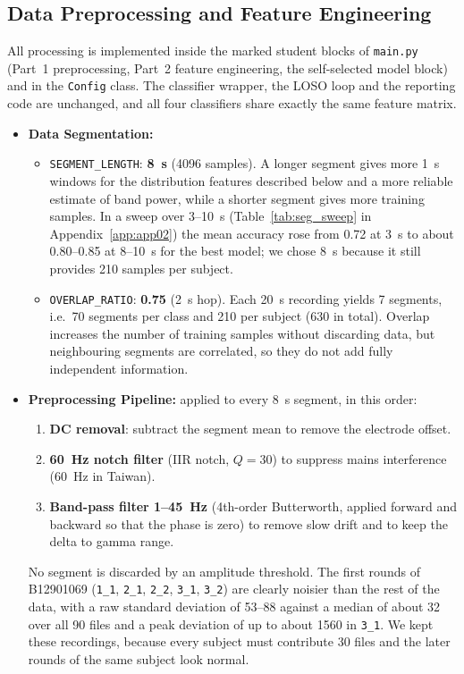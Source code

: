 \subsection{Data Preprocessing and Feature Engineering}
All processing is implemented inside the marked student blocks of \texttt{main.py} (Part~1 preprocessing, Part~2 feature engineering, the self-selected model block) and in the \texttt{Config} class. The classifier wrapper, the LOSO loop and the reporting code are unchanged, and all four classifiers share exactly the same feature matrix.
\begin{itemize}[leftmargin=*]
    \item \textbf{Data Segmentation:}
    \begin{itemize}
        \item \texttt{SEGMENT\_LENGTH}: \textbf{8~s} (4096 samples). A longer segment gives more 1~s windows for the distribution features described below and a more reliable estimate of band power, while a shorter segment gives more training samples. In a sweep over 3--10~s (Table~\ref{tab:seg_sweep} in Appendix~\ref{app:app02}) the mean accuracy rose from 0.72 at 3~s to about 0.80--0.85 at 8--10~s for the best model; we chose 8~s because it still provides 210 samples per subject. 
        \item \texttt{OVERLAP\_RATIO}: \textbf{0.75} (2~s hop). Each 20~s recording yields 7 segments, i.e.\ 70 segments per class and 210 per subject (630 in total). Overlap increases the number of training samples without discarding data, but neighbouring segments are correlated, so they do not add fully independent information.
    \end{itemize}

    \item \textbf{Preprocessing Pipeline:} applied to every 8~s segment, in this order:
    \begin{enumerate}
        \item \textbf{DC removal}: subtract the segment mean to remove the electrode offset.
        \item \textbf{60~Hz notch filter} (IIR notch, $Q=30$) to suppress mains interference (60~Hz in Taiwan).
        \item \textbf{Band-pass filter 1--45~Hz} (4th-order Butterworth, applied forward and backward so that the phase is zero) to remove slow drift and to keep the delta to gamma range.
    \end{enumerate}
    No segment is discarded by an amplitude threshold. The first rounds of B12901069 (\texttt{1\_1}, \texttt{2\_1}, \texttt{2\_2}, \texttt{3\_1}, \texttt{3\_2}) are clearly noisier than the rest of the data, with a raw standard deviation of 53--88 against a median of about 32 over all 90 files and a peak deviation of up to about 1560 in \texttt{3\_1}. We kept these recordings, because every subject must contribute 30 files and the later rounds of the same subject look normal.


\end{itemize}
